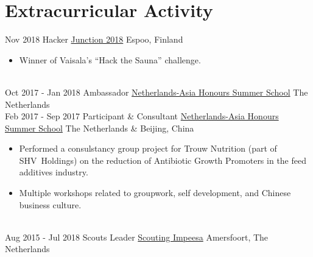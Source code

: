 \documentclass[letterpaper]{twentysecondcv} %
\begin{document}
\section{Extracurricular Activity}
\begin{twenty} %
	\twentyitem
	{Nov 2018}
	{}
	{Hacker}
	{\href{https://2018.hackjunction.com/}{Junction 2018}}
	{Espoo, Finland}
	{
	\begin{itemize}
			\item Winner of Vaisala's ``Hack the Sauna'' challenge.
	\end{itemize}
	}
	\\
	\twentyitem
	{Oct 2017 -}
	{Jan 2018}
	{Ambassador}
	{\href{https://nahss.nl}{Netherlands-Asia Honours Summer School}}
	{The Netherlands}
	{}
	\\
	\twentyitem
	{Feb 2017 -}
	{Sep 2017}
	{Participant \& Consultant}
	{\href{https://nahss.nl}{Netherlands-Asia Honours Summer School}}
	{The Netherlands \& Beijing, China}
	{
		\begin{itemize}
			\item Performed a consulstancy group project for Trouw Nutrition (part of SHV~Holdings) on the reduction of Antibiotic Growth Promoters in the feed additives industry.
			\item Multiple workshops related to groupwork, self development, and Chinese business culture.
		\end{itemize}
	}
	\\
	\twentyitem
	{Aug 2015 -}
	{Jul 2018}
	{Scouts Leader}
	{\href{http://impeesa.nl/}{Scouting Impeesa}}
	{Amersfoort, The Netherlands}
	{}
	\\
\end{twenty}
\end{document}
